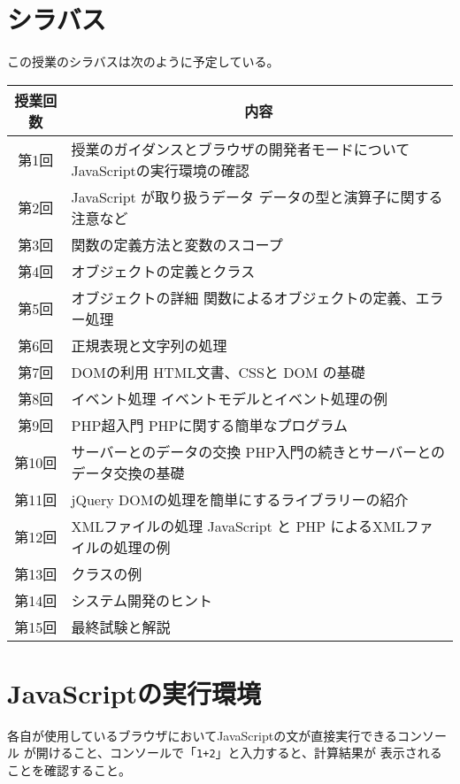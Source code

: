 \section{シラバス}
この授業のシラバスは次のように予定している。
\begin{center}
\begin{tabular}{|c|m{}|}\hline
 授業回数&\multicolumn{1}{c|}{内容}\\\hline
 第1回&授業のガイダンスとブラウザの開発者モードについて \newline
     JavaScriptの実行環境の確認\\\hline
 第2回&JavaScript が取り扱うデータ\newline
     データの型と演算子に関する注意など\\\hline
 第3回& 関数の定義方法と変数のスコープ\\\hline
 第4回& オブジェクトの定義とクラス\\\hline
 第5回&オブジェクトの詳細\newline
     関数によるオブジェクトの定義、エラー処理\\\hline
 第6回&正規表現と文字列の処理  \\\hline
 第7回&DOMの利用\newline
     HTML文書、CSSと DOM の基礎\\\hline
 第8回&イベント処理 \newline
     イベントモデルとイベント処理の例\\\hline
 第9回&PHP超入門\newline
       PHPに関する簡単なプログラム\\\hline
 第10回&サーバーとのデータの交換\newline
     PHP入門の続きとサーバーとのデータ交換の基礎\\\hline
 第11回&jQuery \newline
     DOMの処理を簡単にするライブラリーの紹介\\   \hline
 第12回&XMLファイルの処理\newline
     JavaScript と PHP によるXMLファイルの処理の例\\\hline
 第13回&クラスの例\\\hline
 第14回&システム開発のヒント\\\hline
 第15回&最終試験と解説\\ \hline
\end{tabular}
\end{center}
\section{JavaScriptの実行環境}

\begin{Prob}\upshape
 各自が使用しているブラウザにおいてJavaScriptの文が直接実行できるコンソール
 が開けること、コンソールで「\texttt{1+2}」と入力すると、計算結果が
 表示されることを確認すること。
\end{Prob}
